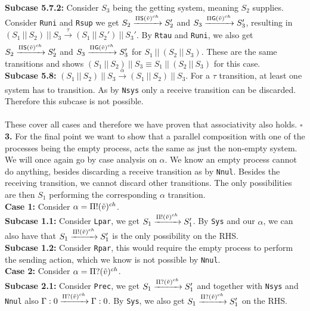 \indent \indent \textbf{Subcase 5.7.2: } Consider $S_3$ being the getting system, meaning $S_2$ supplies. Consider \texttt{Runi} and \texttt{Rsup} we get $S_2\xrightarrow[]{\Pi \mathsf{S}(\Tilde{v})^{ch}} S_2'$ and $S_3\xrightarrow[]{\Pi \mathsf{G}(\Tilde{v})^{ch}} S_3'$, resulting in $(S_1 \ || \ S_2)\ ||\ S_3 \xrightarrow[]{\tau} (S_1 \ || \ S_2')\ ||\ S_3'$. By \texttt{Rtau} and \texttt{Runi}, we also get $S_2\xrightarrow[]{\Pi \mathsf{S}(\Tilde{v})^{ch}} S_2'$ and $S_3\xrightarrow[]{\Pi \mathsf{G}(\Tilde{v})^{ch}} S_3'$ for $S_1 \ ||\ (S_2 \ || \ S_3)$. These are the same transitions and shows $(S_1 \ ||\ S_2 )\ || \ S_3 \equiv S_1 \ ||\ (S_2 \ || \ S_3)$ for this case.\\
\indent \textbf{Subcase 5.8: }$(S_1 \ || \ S_2)\ ||\ S_3 \xrightarrow[]{\alpha} (S_1 \ || \ S_2)\ ||\ S_3$. For a $\tau$ transition, at least one system has to transition. As by \texttt{Nsys} only a receive transition can be discarded. Therefore this subcase is not possible.\\
\\
These cover all cases and therefore we have proven that associativity also holds. $\square$
\\
\textbf{3. }For the final point we want to show that a parallel composition with one of the processes being the empty process, acts the same as just the non-empty system. We will once again go by case analysis on $\alpha$. We know an empty process cannot do anything, besides discarding a receive transition as by \texttt{Nnul}. Besides the receiving transition, we cannot discard other transitions. The only possibilities are then $S_1$ performing the corresponding $\alpha$ transition.\\
\indent \textbf{Case 1: } Consider $\alpha = \Pi ! (\Tilde{v})^{ch}$.\\
\indent \indent \textbf{Subcase 1.1: } Consider \texttt{Lpar}, we get $S_1\xrightarrow[]{\Pi !(\Tilde{v})^{ch}} S_1'$. By \texttt{Sys} and our $\alpha$, we can also have that $S_1\xrightarrow[]{\Pi !(\Tilde{v})^{ch}} S_1'$ is the only possibility on the RHS.\\
\indent \indent \textbf{Subcase 1.2: } Consider \texttt{Rpar}, this would require the empty process to perform the sending action, which we know is not possible by \texttt{Nnul}.\\
\indent \textbf{Case 2: } Consider $\alpha = \Pi ? (\Tilde{v})^{ch}$.\\
\indent \indent \textbf{Subcase 2.1:} Consider \texttt{Prec}, we get $S_1\xrightarrow[]{\Pi ?(\Tilde{v})^{ch}} S_1'$ and together with \texttt{Nsys} and \texttt{Nnul} also $\Gamma : 0\xrightarrow[]{\Pi ?(\Tilde{v})^{ch}} \Gamma : 0$. By \texttt{Sys}, we also get $S_1\xrightarrow[]{\Pi ?(\Tilde{v})^{ch}} S_1'$ on the RHS.\\
